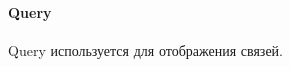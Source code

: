 \documentclass{article}
\begin{document}
\paragraph{Query}
Query используется для отображения связей.
\end{document}
